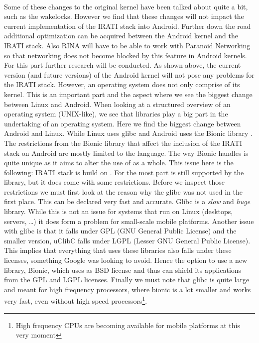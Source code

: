 \\
Some of these changes to the original kernel have been talked about quite a bit, such as the wakelocks. However we find that these changes will not impact the current implementation of the IRATI stack into Android. Further down the road additional optimization can be acquired between the Android kernel and the IRATI stack. Also RINA will have to be able to work with Paranoid Networking so that networking does not become blocked by this feature in Android kernels. For this part further research will be conducted. 
\npar
As shown above, the current version (and future versions) of the Android kernel will not pose any problems for the IRATI stack. However, an operating system does not only comprise of its kernel. This is an important part and the aspect where we see the biggest change between Linux and Android. When looking at a structured overview of an operating system (UNIX-like), we see that libraries play a big part in the undertaking of an operating system. Here we find the biggest change between Android and Linux. While Linux uses glibc \citep{website:glibc} and Android uses the Bionic library \citep{github:bionic,website:c_lib_bionic}. 
\npar
The restrictions from the Bionic library that affect the inclusion of the IRATI stack on Android are mostly limited to the \cpp language. The way Bionic handles \cpp is quite unique as it aims to alter the use of \cpp as a whole. This issue here is the following: IRATI stack is build on \cpp. For the most part \cpp is still supported by the library, but it does come with some restrictions. Before we inspect those restrictions we must first look at the reason why the glibc was not used in the first place. This can be declared very fast and accurate. Glibc is a \emph{slow} and \emph{huge} library. While this is not an issue for systems that run on Linux (desktops, servers, \ldots) it does form a problem for small-scale mobile platforms. Another issue with glibc is that it falls under GPL (GNU General Public License) and the smaller version, uClibC falls under LGPL (Lesser GNU General Public License). This implies that everything that uses these libraries also falls under these licenses, something Google was looking to avoid. Hence the option to use a new library, Bionic, which uses as BSD license and thus can shield its applications from the GPL and LGPL licenses. Finally we must note that glibc is quite large and meant for high frequency processors, where bionic is a lot smaller and works very fast, even without high speed processors\footnote{High frequency CPUs are becoming available for mobile platforms at this very moment}.
